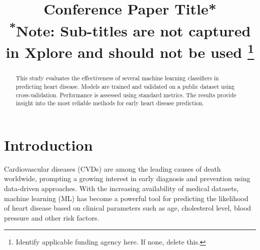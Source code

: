 \documentclass[conference]{IEEEtran}
\begin{document}
\title{Conference Paper Title*\\
{\footnotesize \textsuperscript{*}Note: Sub-titles are not captured in Xplore and
should not be used}
\thanks{Identify applicable funding agency here. If none, delete this.}
}

\author{
\and
{}
\and
{}
\and
{}
}

\maketitle

\begin{abstract}
This study evaluates the effectiveness of several machine learning classifiers in predicting heart disease. 
Models are trained and validated on a public dataset using cross-validation. 
Performance is assessed using standard metrics. 
The results provide insight into the most reliable methods for early heart disease prediction.
\end{abstract}



\begin{IEEEkeywords}

\end{IEEEkeywords}

\section{Introduction}

Cardiovascular diseases (CVDs) are among the leading causes of death worldwide, prompting a growing interest in 
early diagnosis and prevention using data-driven approaches. With the increasing availability of medical datasets, 
machine learning (ML) has become a powerful tool for predicting the likelihood of heart disease based 
on clinical parameters such as age, cholesterol level, blood pressure and other risk factors.
\end{document}
